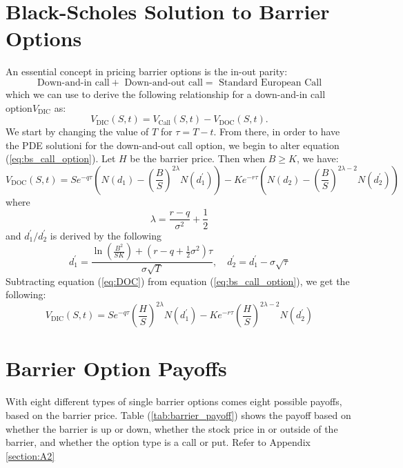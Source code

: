 \section{Black-Scholes Solution to Barrier Options}

An essential concept in pricing barrier options is the in-out parity:
\[
	\text{Down-and-in call}+\text{ Down-and-out call}=\text{ Standard European Call}
\]
which we can use to derive the following relationship for a down-and-in call option$V_{\text{DIC}}$ as:
\[
	V_{\text{DIC}}(S,t)=V_{\text{Call}}(S,t)-V_{\text{DOC}}(S,t).
\]
We start by changing the value of $T$ for $\tau=T-t$. From there, in order to have the PDE solutioni for the down-and-out call option, we begin to alter equation (\ref{eq:bs_call_option}). Let $H$ be the barrier price. Then when $B\geq K$, we have:
\begin{equation}\label{eq:DOC}
	V_{\text{DOC}}(S,t)=Se^{-q\tau}\left(N(d_1)-\left(\frac{B}{S}\right)^{2\lambda}N(d^\prime_1)\right)-Ke^{-r\tau}\left(N(d_2)-\left(\frac{B}{S}\right)^{2\lambda-2} N(d^\prime_2)\right)
\end{equation}
where
\begin{equation}
	\lambda=\frac{r-q}{\sigma^2}+\frac{1}{2}
\end{equation}
and $d^\prime_1/d^\prime_2$ is derived by the following
\begin{equation}
	d^\prime_1=\frac{\ln\left(\frac{B^2}{SK}\right)+(r-q+\tfrac{1}{2}\sigma^2)\tau}{\sigma\sqrt{T}},\quad d^\prime_2=d^\prime_1-\sigma\sqrt{\tau}
\end{equation}
Subtracting equation (\ref{eq:DOC}) from equation (\ref{eq:bs_call_option}), we get the following:
\begin{equation}
	V_{\text{DIC}}(S,t)=Se^{-q\tau}\left(\frac{H}{S}\right)^{2\lambda}N(d^\prime_1)-Ke^{-r\tau}\left(\frac{H}{S}\right)^{2\lambda-2}N(d^\prime_2)
\end{equation}
\section{Barrier Option Payoffs}

With eight different types of single barrier options comes eight possible payoffs, based on the barrier price. Table (\ref{tab:barrier_payoff}) shows the payoff based on whether the barrier is up or down, whether the stock price in or outside of the barrier, and whether the option type is a call or put. Refer to Appendix \ref{section:A2}

